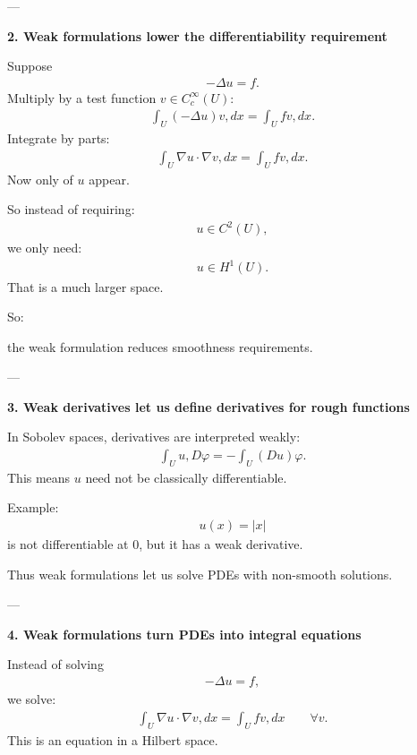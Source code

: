 \documentclass[12pt,a4paper]{report}
\begin{document}
\begin{description}
\begin{description}
---

\item \textbf{2. Weak formulations lower the differentiability requirement}

Suppose
\begin{align*}
-\Delta u=f.
\end{align*}
Multiply by a test function $v\in C_c^\infty(U)$:
\begin{align*}
\int_U (-\Delta u)v,dx=\int_U fv,dx.
\end{align*}
Integrate by parts:
\begin{align*}
\int_U \nabla u\cdot\nabla v,dx=\int_U fv,dx.
\end{align*}
Now only  of $u$ appear.

So instead of requiring:
\begin{align*}
u\in C^2(U),
\end{align*}
we only need:
\begin{align*}
u\in H^1(U).
\end{align*}
That is a much larger space.

So:

\> the weak formulation reduces smoothness requirements.

---

\item \textbf{3. Weak derivatives let us define derivatives for rough functions}

In Sobolev spaces, derivatives are interpreted weakly:
\begin{align*}
\int_U u,D\varphi = -\int_U (Du)\varphi.
\end{align*}
This means $u$ need not be classically differentiable.

Example:
\begin{align*}
u(x)=|x|
\end{align*}
is not differentiable at $0$, but it has a weak derivative.

Thus weak formulations let us solve PDEs with non-smooth solutions.

---

\item \textbf{4. Weak formulations turn PDEs into integral equations}

Instead of solving
\begin{align*}
-\Delta u=f,
\end{align*}
we solve:
\begin{align*}
\int_U \nabla u\cdot\nabla v,dx = \int_U fv,dx \qquad \forall v.
\end{align*}
This is an equation in a Hilbert space.


\end{description}
\end{description}
\end{document}
